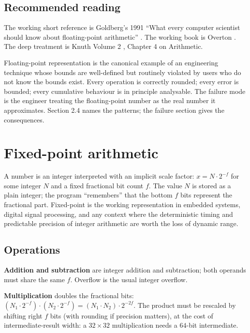 \subsection{Recommended reading}

The working short reference is Goldberg's 1991 ``What every computer scientist should know about floating-point arithmetic'' \cite{text:goldberg1991-floating-point}. The working book is Overton \cite{text:overton-ieee754}. The deep treatment is Knuth Volume 2 \cite{text:knuth-taocp2}, Chapter 4 on Arithmetic.

\begin{archetype}[Failure]
Floating-point representation is the canonical example of an engineering technique whose bounds are well-defined but routinely violated by users who do not know the bounds exist. Every operation is correctly rounded; every error is bounded; every cumulative behaviour is in principle analysable. The failure mode is the engineer treating the floating-point number as the real number it approximates. Section 2.4 names the patterns; the failure section gives the consequences.
\end{archetype}

\section{Fixed-point arithmetic}

A  number is an integer interpreted with an implicit scale factor: $x = N \cdot 2^{-f}$ for some integer $N$ and a fixed fractional bit count $f$. The value $N$ is stored as a plain integer; the program ``remembers'' that the bottom $f$ bits represent the fractional part. Fixed-point is the working representation in embedded systems, digital signal processing, and any context where the deterministic timing and predictable precision of integer arithmetic are worth the loss of dynamic range.

\subsection{Operations}

\textbf{Addition and subtraction} are integer addition and subtraction; both operands must share the same $f$. Overflow is the usual integer overflow.

\textbf{Multiplication} doubles the fractional bits: $(N_1 \cdot 2^{-f}) \cdot (N_2 \cdot 2^{-f}) = (N_1 \cdot N_2) \cdot 2^{-2f}$. The product must be rescaled by shifting right $f$ bits (with rounding if precision matters), at the cost of intermediate-result width: a $32 \times 32$ multiplication needs a $64$-bit intermediate.

